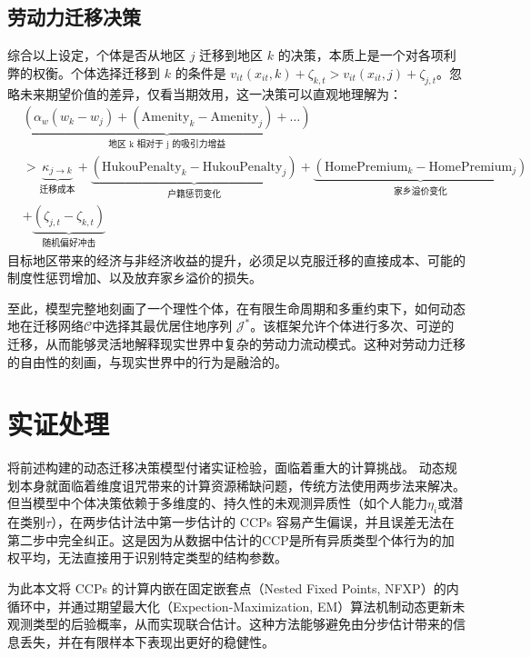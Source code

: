 \documentclass[
  a4paper,
  zihao=-4,
  fontset=mac,
  AutoFakeBold,
  AutoFakeSlant,
  oneside]{ctexbook}
\begin{document}
\section{劳动力迁移决策}

综合以上设定，个体是否从地区 $j$ 迁移到地区 $k$ 的决策，本质上是一个对各项利弊的权衡。个体选择迁移到 $k$ 的条件是 $v_{it}(x_{it}, k) + \zeta_{k,t} > v_{it}(x_{it}, j) + \zeta_{j,t}$。忽略未来期望价值的差异，仅看当期效用，这一决策可以直观地理解为：
\begin{equation}
\begin{split}
  & \underbrace{ \left( \alpha_w (w_k - w_j) + (\text{Amenity}_k - \text{Amenity}_j) + \dots \right) }_{\text{地区 k 相对于 j 的吸引力增益}} \\
  & > \underbrace{\kappa_{j \to k}}_{\text{迁移成本}} + \underbrace{ (\text{HukouPenalty}_k - \text{HukouPenalty}_j) }_{\text{户籍惩罚变化}} + \underbrace{ (\text{HomePremium}_k - \text{HomePremium}_j) }_{\text{家乡溢价变化}} \\
  & + \underbrace{ (\zeta_{j,t} - \zeta_{k,t}) }_{\text{随机偏好冲击}}
\end{split}
\label{eq:迁移motivation_revised}
\end{equation}
目标地区带来的经济与非经济收益的提升，必须足以克服迁移的直接成本、可能的制度性惩罚增加、以及放弃家乡溢价的损失。

至此，模型完整地刻画了一个理性个体，在有限生命周期和多重约束下，如何动态地在迁移网络$\mathcal{C}$中选择其最优居住地序列 $\mathcal{J}^*$。该框架允许个体进行多次、可逆的迁移，从而能够灵活地解释现实世界中复杂的劳动力流动模式。这种对劳动力迁移的自由性的刻画，与现实世界中的行为是融洽的。




\chapter{实证处理}

将前述构建的动态迁移决策模型付诸实证检验，面临着重大的计算挑战。
动态规划本身就面临着维度诅咒带来的计算资源稀缺问题，传统方法使用两步法来解决。但当模型中个体决策依赖于多维度的、持久性的未观测异质性（如个人能力$\eta_i$或潜在类别$\tau$），在两步估计法中第一步估计的 CCPs 容易产生偏误，并且误差无法在第二步中完全纠正。这是因为从数据中估计的CCP是所有异质类型个体行为的加权平均，无法直接用于识别特定类型的结构参数。

为此本文将 CCPs 的计算内嵌在固定嵌套点（Nested Fixed Points, NFXP）的内循环中，并通过期望最大化（Expection-Maximization, EM）算法机制动态更新未观测类型的后验概率，从而实现联合估计。这种方法能够避免由分步估计带来的信息丢失，并在有限样本下表现出更好的稳健性。
\end{document}
